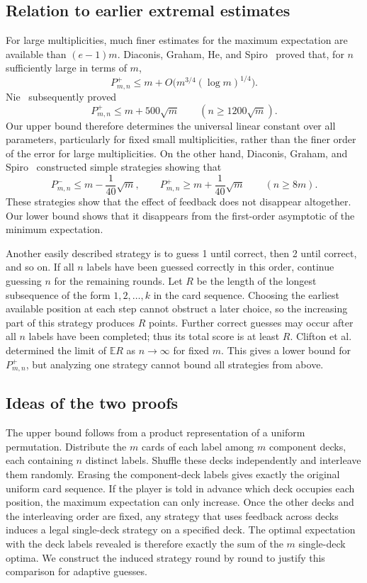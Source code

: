 \documentclass[11pt,reqno]{amsart}
\numberwithin{equation}{section}
\theoremstyle{remark}
\theoremstyle{definition}
\newcommand{\E}{\mathbb E}
\begin{document}
\subsection{Relation to earlier extremal estimates}
For large multiplicities, much finer estimates for the maximum expectation are available than $(e-1)m$. Diaconis, Graham, He, and Spiro~\cite[Theorem~1.3]{DGHS} proved that, for $n$ sufficiently large in terms of $m$,
\[
 P^+_{m,n}\le m+O\bigl(m^{3/4}(\log m)^{1/4}\bigr).
\]
Nie~\cite[Theorem~1.3]{Nie} subsequently proved
\[
 P^+_{m,n}\le m+500\sqrt m\qquad(n\ge1200\sqrt m).
\]
Our upper bound therefore determines the universal linear constant over all parameters, particularly for fixed small multiplicities, rather than the finer order of the error for large multiplicities. On the other hand, Diaconis, Graham, and Spiro~\cite[Theorem~1]{DGS} constructed simple strategies showing that
\[
 P^-_{m,n}\le m-\frac1{40}\sqrt m,
 \qquad
 P^+_{m,n}\ge m+\frac1{40}\sqrt m
 \qquad(n\ge8m).
\]
These strategies show that the effect of feedback does not disappear altogether. Our lower bound shows that it disappears from the first-order asymptotic of the minimum expectation.

Another easily described strategy is to guess 1 until correct, then 2 until correct, and so on. If all $n$ labels have been guessed correctly in this order, continue guessing $n$ for the remaining rounds. Let $R$ be the length of the longest subsequence of the form $1,2,\ldots,k$ in the card sequence. Choosing the earliest available position at each step cannot obstruct a later choice, so the increasing part of this strategy produces $R$ points. Further correct guesses may occur after all $n$ labels have been completed; thus its total score is at least $R$. Clifton et al.~\cite[Theorem~1.1]{CDHSY} determined the limit of $\E R$ as $n\to\infty$ for fixed $m$. This gives a lower bound for $P^+_{m,n}$, but analyzing one strategy cannot bound all strategies from above.

\subsection{Ideas of the two proofs}
The upper bound follows from a product representation of a uniform permutation. Distribute the $m$ cards of each label among $m$ component decks, each containing $n$ distinct labels. Shuffle these decks independently and interleave them randomly. Erasing the component-deck labels gives exactly the original uniform card sequence. If the player is told in advance which deck occupies each position, the maximum expectation can only increase. Once the other decks and the interleaving order are fixed, any strategy that uses feedback across decks induces a legal single-deck strategy on a specified deck. The optimal expectation with the deck labels revealed is therefore exactly the sum of the $m$ single-deck optima. We construct the induced strategy round by round to justify this comparison for adaptive guesses.
\end{document}
